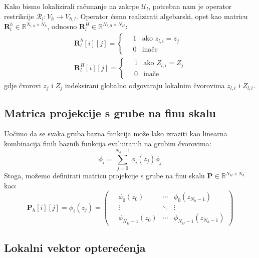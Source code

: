 \documentclass[zavrsnirad]{fer}
\begin{document}
Kako bismo lokalizirali računanje na zakrpe $\mathcal{U}_l$, potreban nam je operator restrikcije
$\mathcal{R}_l : V_h \to V_{h,l}$. Operator ćemo realizirati algebarski, opet kao matricu
$\mathbf{R}^h_l \in \mathbb{R}^{N_{l,h} \times N_h}$, odnosno $\mathbf{R}^H_l \in \mathbb{R}^{N_{l,H} \times N_H}$:
\begin{align}
  \label{jed:local_restriction_matrix}
  \mathbf{R}^h_l[i][j] = \begin{cases}
    \quad 1 & \text{ako } z_{l,i} = z_j \\
    \quad 0 & \text{inače}
  \end{cases} \\
  \mathbf{R}^H_l[i][j] = \begin{cases}
    \quad 1 & \text{ako } Z_{l,i} = Z_j \\
    \quad 0 & \text{inače}
  \end{cases}
\end{align}
gdje čvorovi $z_j$ i $Z_j$ indeksirani globalno odgovaraju lokalnim čvorovima $z_{l,i}$ i $Z_{l,i}$.


\subsection{Matrica projekcije s grube na finu skalu}

Uočimo da se svaka gruba bazna funkcija može lako izraziti kao linearna kombinacija finih baznih funkcija
evaluiranih na grubim čvorovima:
\begin{equation}
  \label{jed:coarse_to_fine_lin_comb}
  \phi_i = \sum_{j=0}^{N_h - 1} \phi_i(z_j) \phi_j
\end{equation}
Stoga, možemo definirati matricu projekcije s grube na finu skalu $\mathbf{P} \in \mathbb{R}^{N_H \times N_h}$ kao:
\begin{equation}
  \label{jed:coarse_to_fine_matrix}
  \mathbf{P}_h[i][j] = \phi_i(z_j) = \begin{pmatrix}
    \quad \phi_0(z_0) & \cdots & \phi_0(z_{N_h - 1}) \\
    \quad \vdots & \ddots & \vdots \\
    \quad \phi_{N_H - 1}(z_0) & \cdots & \phi_{N_H - 1}(z_{N_h - 1})
  \end{pmatrix}
\end{equation}


\subsection{Lokalni vektor opterećenja}
\end{document}

